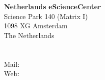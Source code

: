 

\setlength{\parindent}{0pt}
\setlength{\parskip}{1em}


\vspace{10cm} 
\textbf{Netherlands eScienceCenter} \\
Science Park 140 (Matrix I)\\
1098 XG Amsterdam\\
The Netherlands \\
\\
 \\
Mail:  \\
Web:  \\
